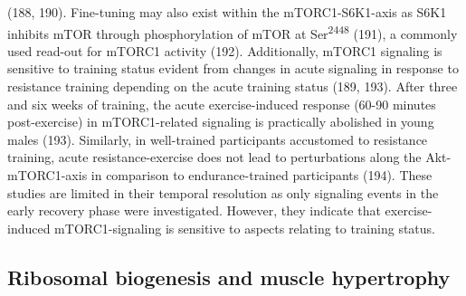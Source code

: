 \documentclass[twoside,10pt]{gihclass} %
\begin{document}
(188, 190).
Fine-tuning may also exist within the mTORC1-S6K1-axis as S6K1 inhibits mTOR through phosphorylation of mTOR at Ser\textsuperscript{2448}
(191),
a commonly used read-out for mTORC1 activity
(192).
Additionally, mTORC1 signaling is sensitive to training status evident from changes in acute signaling in response to resistance training depending on the acute training status
(189, 193).
After three and six weeks of training, the acute exercise-induced response (60-90 minutes post-exercise) in mTORC1-related signaling is practically abolished in young males
(193).
Similarly, in well-trained participants accustomed to resistance training, acute resistance-exercise does not lead to perturbations along the Akt-mTORC1-axis in comparison to endurance-trained participants
(194).
These studies are limited in their temporal resolution as only signaling events in the early recovery phase were investigated.
However, they indicate that exercise-induced mTORC1-signaling is sensitive to aspects relating to training status.

\hypertarget{ribosomal-biogenesis-and-muscle-hypertrophy}{%
\subsection{Ribosomal biogenesis and muscle hypertrophy}\label{ribosomal-biogenesis-and-muscle-hypertrophy}}
\end{document}
